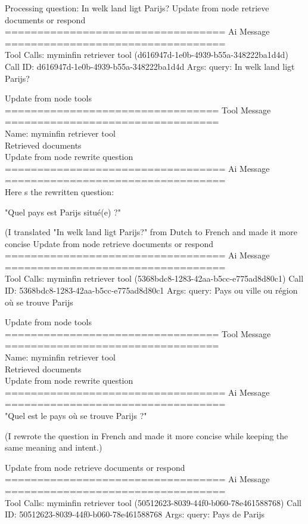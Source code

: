 Processing question: In welk land ligt Parijs?
Update from node retrieve documents or respond
\\[1em]
================================== Ai Message ==================================
\\[1em]
Tool Calls:
myminfin retriever tool (d616947d-1e0b-4939-b55a-348222ba1d4d)
Call ID: d616947d-1e0b-4939-b55a-348222ba1d4d
Args:
query: In welk land ligt Parijs?

Update from node tools
\\[1em]
================================= Tool Message =================================
\\[1em]
Name: myminfin retriever tool
\\[1em]
Retrieved documents
\\[1em]

Update from node rewrite question
\\[1em]
================================== Ai Message ==================================
\\[1em]
Here s the rewritten question:

"Quel pays est Parijs situé(e) ?"

(I translated "In welk land ligt Parijs?" from Dutch to French and made it more concise
Update from node retrieve documents or respond
\\[1em]
================================== Ai Message ==================================
\\[1em]
Tool Calls:
myminfin retriever tool (5368bdc8-1283-42aa-b5cc-e775ad8d80c1)
Call ID: 5368bdc8-1283-42aa-b5cc-e775ad8d80c1
Args:
query: Pays ou ville ou région où se trouve Parijs

Update from node tools
\\[1em]
================================= Tool Message =================================
\\[1em]
Name: myminfin retriever tool
\\[1em]
Retrieved documents
\\[1em]

Update from node rewrite question
\\[1em]
================================== Ai Message ==================================
\\[1em]
"Quel est le pays où se trouve Parijs ?"

(I rewrote the question in French and made it more concise while keeping the same meaning and intent.)

Update from node retrieve documents or respond
\\[1em]
================================== Ai Message ==================================
\\[1em]
Tool Calls:
myminfin retriever tool (50512623-8039-44f0-b060-78e461588768)
Call ID: 50512623-8039-44f0-b060-78e461588768
Args:
query: Pays de Parijs

